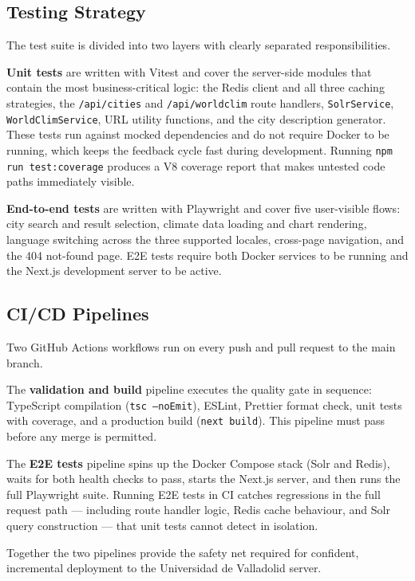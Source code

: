 \subsection{Testing Strategy}\label{APP_QA_TESTS}

The test suite is divided into two layers with clearly separated
responsibilities.

\textbf{Unit tests} are written with Vitest and cover the server-side modules
that contain the most business-critical logic: the Redis client and all three
caching strategies, the \texttt{/api/cities} and \texttt{/api/worldclim} route
handlers, \texttt{SolrService}, \texttt{WorldClimService}, URL utility functions,
and the city description generator. These tests run against mocked dependencies
and do not require Docker to be running, which keeps the feedback cycle fast
during development. Running \texttt{npm run test:coverage} produces a V8
coverage report that makes untested code paths immediately visible.

\textbf{End-to-end tests} are written with Playwright and cover five
user-visible flows: city search and result selection, climate data loading and
chart rendering, language switching across the three supported locales,
cross-page navigation, and the 404 not-found page. E2E tests require both
Docker services to be running and the Next.js development server to be active.

\subsection{CI/CD Pipelines}\label{APP_QA_CICD}

Two GitHub Actions workflows run on every push and pull request to the main
branch.

The \textbf{validation and build} pipeline executes the quality gate in
sequence: TypeScript compilation (\texttt{tsc --noEmit}), ESLint, Prettier
format check, unit tests with coverage, and a production build
(\texttt{next build}). This pipeline must pass before any merge is permitted.

The \textbf{E2E tests} pipeline spins up the Docker Compose stack (Solr and
Redis), waits for both health checks to pass, starts the Next.js server, and
then runs the full Playwright suite. Running E2E tests in CI catches regressions
in the full request path --- including route handler logic, Redis cache
behaviour, and Solr query construction --- that unit tests cannot detect in
isolation.

Together the two pipelines provide the safety net required for confident,
incremental deployment to the Universidad de Valladolid server.


